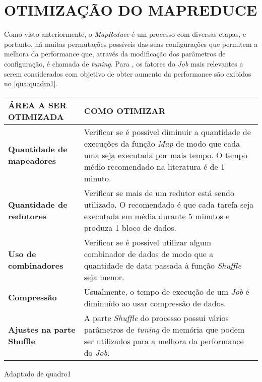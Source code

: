 \chapter{OTIMIZAÇÃO DO MAPREDUCE} \label{cha:otimizacaomapreduce}

Como visto anteriormente, o \textit{MapReduce} é um processo com diversas etapas, e portanto, há muitas permutações possíveis das suas configurações que permitem a melhora da performance que, através da modificação dos parâmetros de configuração, é chamada de \textit{tuning}. Para \textcite{HadoopBook15}, os fatores do \textit{Job} mais relevantes a serem considerados com objetivo de obter aumento da performance são exibidos no \autoref{qua:quadro1}.

{\footnotesize
  \centering
  \begin{tabular}{|p{50mm}|p{100mm}|}\hline
    \textbf{ÁREA A SER OTIMIZADA}     & \textbf{COMO OTIMIZAR}                                                                                                                                                                       \\\hline
    \textbf{Quantidade de mapeadores} & Verificar se é possível diminuir a quantidade de execuções da função \textit{Map} de modo que cada uma seja executada por mais tempo. O tempo médio recomendado na literatura é de 1 minuto. \\\hline
    \textbf{Quantidade de redutores}  & Verificar se mais de um redutor está sendo utilizado. O recomendado é que cada tarefa seja executada em média durante 5 minutos e produza 1 bloco de dados.                                  \\\hline
    \textbf{Uso de combinadores}      & Verificar se é possível utilizar algum combinador de dados de modo que a quantidade de data passada à função \textit{Shuffle} seja menor.                                                    \\\hline
    \textbf{Compressão}               & Usualmente, o tempo de execução de um \textit{Job} é diminuído ao usar compressão de dados.                                                                                                  \\\hline
    \textbf{Ajustes na parte Shuffle} & A parte \textit{Shuffle} do processo possui vários parâmetros de \textit{\gls{tuning}} de memória que podem ser utilizados para a melhora da performance do \textit{Job}.                          \\\hline
  \end{tabular}}
{Adaptado de \cite{HadoopBook15}}{quadro1}{}{}




